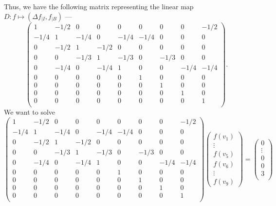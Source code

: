 \documentclass[12 pt, letterpaper]{hmcpset}
\begin{document}
\begin{solution}
	Thus, we have the following matrix representing the linear map $D : f \mapsto (\Delta f_{\mid I}, f_{\mid B})$ ---
	\[
		\begin{pmatrix}
			1 & -1/2 & 0 & 0 & 0 & 0 & 0 & 0 & -1/2 \\
			-1/4 & 1 & -1/4 & 0 & -1/4 & -1/4 & 0 & 0 & 0 \\
			0 & -1/2 & 1 & -1/2 & 0 & 0 & 0 & 0 & 0 \\
			0 & 0 & -1/3 & 1 & -1/3 & 0 & -1/3 & 0 & 0 \\
			0 & -1/4 & 0 & -1/4 & 1 & 0 & 0 & -1/4 & -1/4 \\
			0 & 0 & 0 & 0 & 0 & 1 & 0 & 0 & 0 \\
			0 & 0 & 0 & 0 & 0 & 0 & 1 & 0 & 0 \\
			0 & 0 & 0 & 0 & 0 & 0 & 0 & 1 & 0 \\
			0 & 0 & 0 & 0 & 0 & 0 & 0 & 0 & 1 \\
		\end{pmatrix}.
	\]
	We want to solve
	\[
		\begin{pmatrix}
			1 & -1/2 & 0 & 0 & 0 & 0 & 0 & 0 & -1/2 \\
			-1/4 & 1 & -1/4 & 0 & -1/4 & -1/4 & 0 & 0 & 0 \\
			0 & -1/2 & 1 & -1/2 & 0 & 0 & 0 & 0 & 0 \\
			0 & 0 & -1/3 & 1 & -1/3 & 0 & -1/3 & 0 & 0 \\
			0 & -1/4 & 0 & -1/4 & 1 & 0 & 0 & -1/4 & -1/4 \\
			0 & 0 & 0 & 0 & 0 & 1 & 0 & 0 & 0 \\
			0 & 0 & 0 & 0 & 0 & 0 & 1 & 0 & 0 \\
			0 & 0 & 0 & 0 & 0 & 0 & 0 & 1 & 0 \\
			0 & 0 & 0 & 0 & 0 & 0 & 0 & 0 & 1 \\
		\end{pmatrix} \begin{pmatrix}
			f(v_{1}) \\
			\vdots \\
			f(v_{5}) \\
			f(v_{6}) \\
			\vdots \\
			f(v_{9})
		\end{pmatrix} = \begin{pmatrix}
			0 \\
			\vdots \\
			0 \\
			0 \\
			3 \\

\end{pmatrix}\]
\end{solution}
\end{document}
